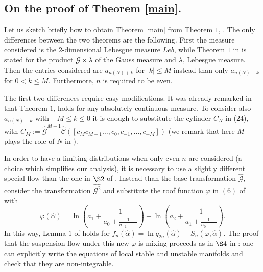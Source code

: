\documentclass{conm-p-l}
\numberwithin{equation}{section}
\begin{document}
\subsection{On the proof of Theorem \ref{main}.}\label{appendixthmdiff}
Let us sketch briefly  how to obtain Theorem \ref{main} from 
Theorem $1$, \cite{SU:ren}.
The only differences between the two theorems 
 are the following. First the measure considered is the $2$-dimensional Lebesgue measure $Leb$, while Theorem  $1$ in \cite{SU:ren} is stated for the product ${\mathscr{G}} \times \lambda$ of the Gauss measure and $\lambda$, Lebesgue measure. Then the entries considered are $a_{n(N)+k}$ for $| k | \leq  M$  instead than only $a_{n(N)+k}$ for $0< k \leq  M$. Furthermore, $n$ is required to be even.

The first two differences require  easy modifications. It was already remarked in  \cite{SU:ren} that  Theorem $1$, \cite{SU:ren} holds for any absolutely continuous measure. To consider also $a_{n(N)+k}$ with $-M\leq k
\leq 0$ it is enough to substitute the cylinder $C_N$ in ($24$),\cite{SU:ren}  with
$ C_M := {\hat{{\mathscr{G}}}}^{M-1} {{\hat{{\mathcal{C}}}}{([{ c_{M} c_{M-1} \dots, c_0, c_{-1}, \dots,  c_{-M} }]) }}$ (we remark that here $M$ plays the role of $N$ in \cite{SU:ren}).

In order to have a limiting distributions when only even $n$ are considered (a choice which simplifies our analysis), it is necessary to use a slightly different special flow than the one in $\S 2$ of \cite{SU:ren}. Instead than the base transformation  ${\hat{{\mathscr{G}}}}$, consider the transformation  ${\hat{{{\mathscr{G}}^2}}}$ and substitute the roof function $\varphi $ in $(6)$ of \cite{SU:ren} with
\begin{equation*}
\varphi({\hat{{\alpha}}}) = \ln \left( a_1 + \frac{1}{a_0 + \frac{1}{a_{-1} + {\dots }}} \right) + \ln \left( a_2 + \frac{1}{a_1 + \frac{1}{a_{0} + {\dots }}} \right) .
\end{equation*}
In this way, Lemma $1$ of \cite{SU:ren} holds for $f_n({\hat{{\alpha}}}) = \ln q_{2n} ({\hat{{\alpha}}}) - {S_{{n}}({\varphi}, {{\hat{{\alpha}}}})}$. The proof that the suspension flow under this new $\varphi$ is mixing proceeds as in $\S 4$ in \cite{SU:ren}: one can explicitly write the equations of local stable and unstable manifolds and check that they are non-integrable.




\end{document}
